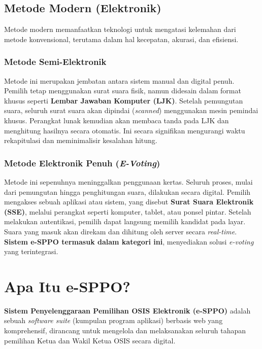 \subsection{Metode Modern (Elektronik)}
Metode modern memanfaatkan teknologi untuk mengatasi kelemahan dari metode konvensional, terutama dalam hal kecepatan, akurasi, dan efisiensi.

\subsubsection{Metode Semi-Elektronik}
Metode ini merupakan jembatan antara sistem manual dan digital penuh. Pemilih tetap menggunakan surat suara fisik, namun didesain dalam format khusus seperti \textbf{Lembar Jawaban Komputer (LJK)}. Setelah pemungutan suara, seluruh surat suara akan dipindai (\textit{scanned}) menggunakan mesin pemindai khusus. Perangkat lunak kemudian akan membaca tanda pada LJK dan menghitung hasilnya secara otomatis. Ini secara signifikan mengurangi waktu rekapitulasi dan meminimalisir kesalahan hitung.

\subsubsection{Metode Elektronik Penuh (\textit{E-Voting})}
Metode ini sepenuhnya meninggalkan penggunaan kertas. Seluruh proses, mulai dari pemungutan hingga penghitungan suara, dilakukan secara digital. Pemilih mengakses sebuah aplikasi atau sistem, yang disebut \textbf{Surat Suara Elektronik (SSE)}, melalui perangkat seperti komputer, tablet, atau ponsel pintar. Setelah melakukan autentikasi, pemilih dapat langsung memilih kandidat pada layar. Suara yang masuk akan direkam dan dihitung oleh server secara \textit{real-time}. \textbf{Sistem e-SPPO termasuk dalam kategori ini}, menyediakan solusi \textit{e-voting} yang terintegrasi.

\section{Apa Itu e-SPPO?}
\label{sec:apa_itu_esppo}

\textbf{Sistem Penyelenggaraan Pemilihan OSIS Elektronik (e-SPPO)} adalah sebuah \textit{software suite} (kumpulan program aplikasi) berbasis web yang komprehensif, dirancang untuk mengelola dan melaksanakan seluruh tahapan pemilihan Ketua dan Wakil Ketua OSIS secara digital.

